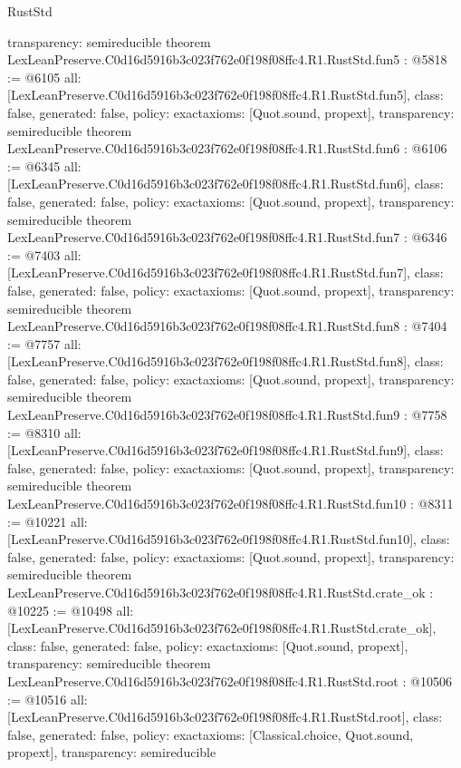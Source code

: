 \begin{lexlean}{RustStd}
\begin{coremodule}
{  transparency: semireducible
}
theorem LexLeanPreserve.C0d16d5916b3c023f762e0f198f08ffc4.R1.RustStd.fun5 : @5818 := @6105 {
  all: [LexLeanPreserve.C0d16d5916b3c023f762e0f198f08ffc4.R1.RustStd.fun5],
  class: false,
  generated: false,
  policy: exact{axioms: [Quot.sound, propext]},
  transparency: semireducible
}
theorem LexLeanPreserve.C0d16d5916b3c023f762e0f198f08ffc4.R1.RustStd.fun6 : @6106 := @6345 {
  all: [LexLeanPreserve.C0d16d5916b3c023f762e0f198f08ffc4.R1.RustStd.fun6],
  class: false,
  generated: false,
  policy: exact{axioms: [Quot.sound, propext]},
  transparency: semireducible
}
theorem LexLeanPreserve.C0d16d5916b3c023f762e0f198f08ffc4.R1.RustStd.fun7 : @6346 := @7403 {
  all: [LexLeanPreserve.C0d16d5916b3c023f762e0f198f08ffc4.R1.RustStd.fun7],
  class: false,
  generated: false,
  policy: exact{axioms: [Quot.sound, propext]},
  transparency: semireducible
}
theorem LexLeanPreserve.C0d16d5916b3c023f762e0f198f08ffc4.R1.RustStd.fun8 : @7404 := @7757 {
  all: [LexLeanPreserve.C0d16d5916b3c023f762e0f198f08ffc4.R1.RustStd.fun8],
  class: false,
  generated: false,
  policy: exact{axioms: [Quot.sound, propext]},
  transparency: semireducible
}
theorem LexLeanPreserve.C0d16d5916b3c023f762e0f198f08ffc4.R1.RustStd.fun9 : @7758 := @8310 {
  all: [LexLeanPreserve.C0d16d5916b3c023f762e0f198f08ffc4.R1.RustStd.fun9],
  class: false,
  generated: false,
  policy: exact{axioms: [Quot.sound, propext]},
  transparency: semireducible
}
theorem LexLeanPreserve.C0d16d5916b3c023f762e0f198f08ffc4.R1.RustStd.fun10 : @8311 := @10221 {
  all: [LexLeanPreserve.C0d16d5916b3c023f762e0f198f08ffc4.R1.RustStd.fun10],
  class: false,
  generated: false,
  policy: exact{axioms: [Quot.sound, propext]},
  transparency: semireducible
}
theorem LexLeanPreserve.C0d16d5916b3c023f762e0f198f08ffc4.R1.RustStd.crate_ok : @10225 := @10498 {
  all: [LexLeanPreserve.C0d16d5916b3c023f762e0f198f08ffc4.R1.RustStd.crate_ok],
  class: false,
  generated: false,
  policy: exact{axioms: [Quot.sound, propext]},
  transparency: semireducible
}
theorem LexLeanPreserve.C0d16d5916b3c023f762e0f198f08ffc4.R1.RustStd.root : @10506 := @10516 {
  all: [LexLeanPreserve.C0d16d5916b3c023f762e0f198f08ffc4.R1.RustStd.root],
  class: false,
  generated: false,
  policy: exact{axioms: [Classical.choice, Quot.sound, propext]},
  transparency: semireducible
}


\end{coremodule}
\end{lexlean}
